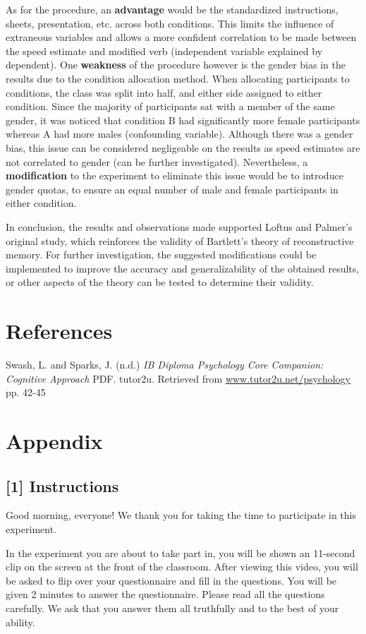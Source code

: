 \documentclass[12pt]{article}
\begin{document}
As for the procedure, an \textbf{advantage} would be the standardized instructions, sheets, presentation, etc. across both conditions. This limits the influence of extraneous variables and allows a more confident correlation to be made between the speed estimate and modified verb (independent variable explained by dependent). One \textbf{weakness} of the procedure however is the gender bias in the results due to the condition allocation method. When allocating participants to conditions, the class was split into half, and either side assigned to either condition. Since the majority of participants sat with a member of the same gender, it was noticed that condition B had significantly more female participants whereas A had more males (confounding variable). Although there was a gender bias, this issue can be considered negligeable on the results as speed estimates are not correlated to gender (can be further investigated). Nevertheless, a \textbf{modification} to the experiment to eliminate this issue would be to introduce gender quotas, to ensure an equal number of male and female participants in either condition. 

In conclusion, the results and observations made supported Loftus and Palmer's original study, which reinforces the validity of Bartlett's theory of reconstructive memory. For further investigation, the suggested modifications could be implemented to improve the accuracy and generalizability of the obtained results, or other aspects of the theory can be tested to determine their validity. 

\section{References}
Swash, L. and Sparks, J. (n.d.) \textit{IB Diploma Psychology Core Companion: Cognitive Approach} PDF. tutor2u. Retrieved from \url{www.tutor2u.net/psychology} pp. 42-45 

\section{Appendix}
\subsection*{[1] Instructions}
Good morning, everyone! We thank you for taking the time to participate in this experiment. 

In the experiment you are about to take part in, you will be shown an 11-second clip on the screen at the front of the classroom. After viewing this video, you will be asked to flip over your questionnaire and fill in the questions. You will be given 2 minutes to answer the questionnaire. Please read all the questions carefully. We ask that you answer them all truthfully and to the best of your ability.
\end{document}
